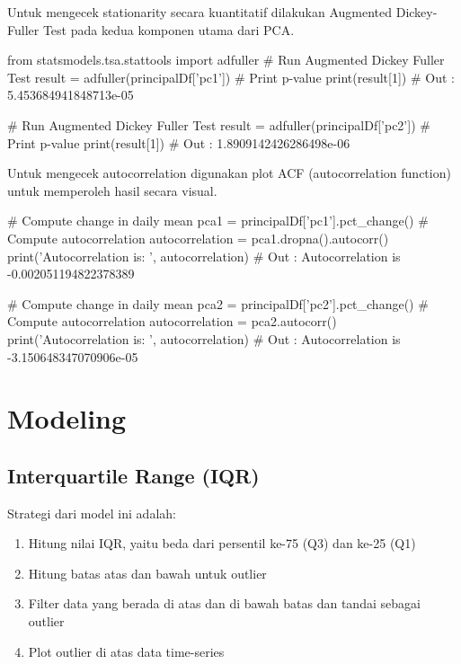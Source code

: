         Untuk mengecek stationarity secara kuantitatif dilakukan Augmented Dickey-Fuller Test pada kedua komponen utama dari PCA.

\begin{python}
from statsmodels.tsa.stattools import adfuller
# Run Augmented Dickey Fuller Test
result = adfuller(principalDf['pc1'])
# Print p-value
print(result[1])
# Out : 5.453684941848713e-05

# Run Augmented Dickey Fuller Test
result = adfuller(principalDf['pc2'])
# Print p-value
print(result[1])
# Out : 1.8909142426286498e-06
\end{python}

        Untuk mengecek autocorrelation digunakan plot ACF (autocorrelation function) untuk memperoleh hasil secara visual.

\begin{python}
# Compute change in daily mean 
pca1 = principalDf['pc1'].pct_change()
# Compute autocorrelation
autocorrelation = pca1.dropna().autocorr()
print('Autocorrelation is: ', autocorrelation)
# Out : Autocorrelation is -0.002051194822378389

# Compute change in daily mean 
pca2 = principalDf['pc2'].pct_change()
# Compute autocorrelation
autocorrelation = pca2.autocorr()
print('Autocorrelation is: ', autocorrelation)
# Out : Autocorrelation is -3.150648347070906e-05
\end{python}

\section{Modeling}

    \subsection{Interquartile Range (IQR)}

    Strategi dari model ini adalah:

    \begin{enumerate}
        \item Hitung nilai IQR, yaitu beda dari persentil ke-75 (Q3) dan ke-25 (Q1)
        \item Hitung batas atas dan bawah untuk outlier
        \item Filter data yang berada di atas dan di bawah batas dan tandai sebagai outlier
        \item Plot outlier di atas data time-series
    \end{enumerate}

